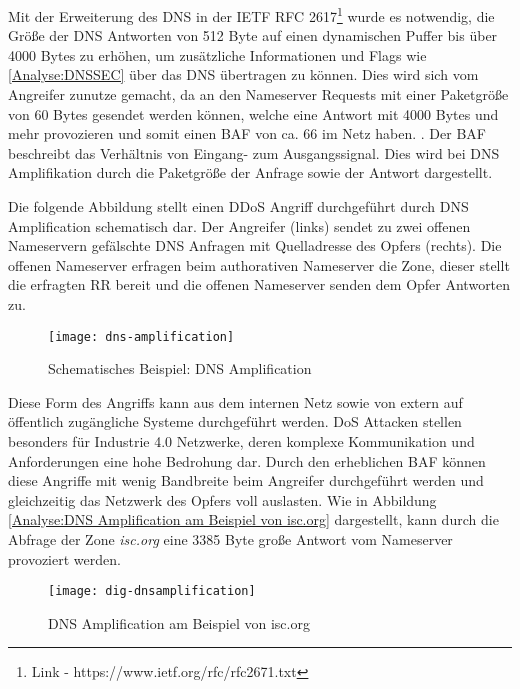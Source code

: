 Mit der Erweiterung des \ac{DNS} in der \ac{IETF} \ac{RFC} 2617\footnote{Link - https://www.ietf.org/rfc/rfc2671.txt} wurde es notwendig, die Größe der \ac{DNS} Antworten von 512 Byte auf einen dynamischen Puffer bis über 4000 Bytes zu erhöhen, um zusätzliche Informationen und Flags wie \autoref{Analyse:DNSSEC} über das \ac{DNS} übertragen zu können. Dies wird sich vom Angreifer zunutze gemacht, da an den Nameserver Requests mit einer Paketgröße von 60 Bytes gesendet werden können, welche eine Antwort mit 4000 Bytes und mehr provozieren und somit einen \ac{BAF} von ca. 66 im Netz haben. \cite{Ledermueller2009}. Der \ac{BAF} beschreibt das Verhältnis von Eingang- zum Ausgangssignal. Dies wird bei \ac{DNS} Amplifikation durch die Paketgröße der Anfrage sowie der Antwort dargestellt.

Die folgende Abbildung stellt einen \ac{DDoS} Angriff durchgeführt durch \ac{DNS} Amplification schematisch dar. Der Angreifer (links) sendet zu zwei offenen Nameservern gefälschte \ac{DNS} Anfragen mit Quelladresse des Opfers (rechts). Die offenen Nameserver erfragen beim authorativen Nameserver die Zone, dieser stellt die erfragten \ac{RR} bereit und die offenen Nameserver senden dem Opfer Antworten zu.

\begin{figure}[h]
    \centering
    \texttt{[image: dns-amplification]}
    \caption{Schematisches Beispiel: DNS Amplification}
    \label{Analyse:DNS Amplification}
  \end{figure}
  
\clearpage

Diese Form des Angriffs kann aus dem internen Netz sowie von extern auf öffentlich zugängliche Systeme durchgeführt werden. \ac{DoS} Attacken stellen besonders für Industrie 4.0 Netzwerke, deren komplexe Kommunikation und Anforderungen eine hohe Bedrohung dar. Durch den erheblichen \ac{BAF} können diese Angriffe mit wenig Bandbreite beim Angreifer durchgeführt werden und gleichzeitig das Netzwerk des Opfers voll auslasten. Wie in Abbildung \autoref{Analyse:DNS Amplification am Beispiel von isc.org} dargestellt, kann durch die Abfrage der Zone \textit{isc.org} eine 3385 Byte große Antwort vom Nameserver provoziert werden. 

\begin{figure}[h]
    \centering
    \texttt{[image: dig-dnsamplification]}
    \caption{DNS Amplification am Beispiel von isc.org}
    \label{Analyse:DNS Amplification am Beispiel von isc.org}
  \end{figure}
  
